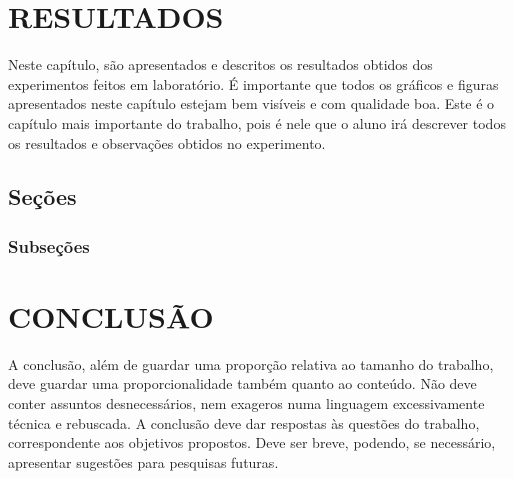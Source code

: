\documentclass[a4paper,12pt]{article}
\begin{document}
\thispagestyle{main}

\section{RESULTADOS}


\hspace{4ex}Neste capítulo, são apresentados e descritos os resultados obtidos dos experimentos feitos em laboratório. É importante que todos os gráficos e figuras apresentados neste capítulo estejam bem visíveis e com qualidade boa. Este é o capítulo mais importante do trabalho, pois é nele que o aluno irá descrever todos os resultados e observações obtidos no experimento.

\subsection{Seções}

\subsubsection{Subseções}

\newpage


\thispagestyle{main}

\section{CONCLUSÃO}


\hspace{4ex}A conclusão, além de guardar uma proporção relativa ao tamanho do trabalho,
deve guardar uma proporcionalidade também quanto ao conteúdo. Não deve conter
assuntos desnecessários, nem exageros numa linguagem excessivamente técnica e
rebuscada. A conclusão deve dar respostas às questões do trabalho, correspondente aos
objetivos propostos. Deve ser breve, podendo, se necessário, apresentar sugestões para
pesquisas futuras.

\newpage




\appendix


\end{document}
